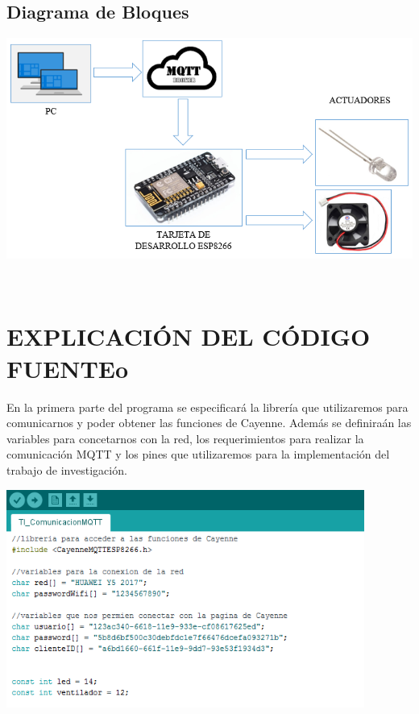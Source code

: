 \documentclass[letterpaper, 10 pt, conference]{ieeeconf}
\begin{document}
\subsection{Diagrama de Bloques}

\begin{center}
\includegraphics[scale=0.45]{Figura3.png}
\begin{scriptsize}\\ 

\end{scriptsize}
\end{center}

\section{EXPLICACIÓN DEL CÓDIGO FUENTEo}
En la primera parte del programa se especificará la librería que utilizaremos para comunicarnos y poder obtener las funciones de Cayenne. Además se definiraán las variables para concetarnos con la red, los requerimientos para realizar la comunicación MQTT y los pines que utilizaremos para la implementación del trabajo de investigación.

\begin{center}
\includegraphics[scale=0.5]{Figura4.png}
\begin{scriptsize}\\ 
 
\end{scriptsize}
\end{center}
\end{document}
